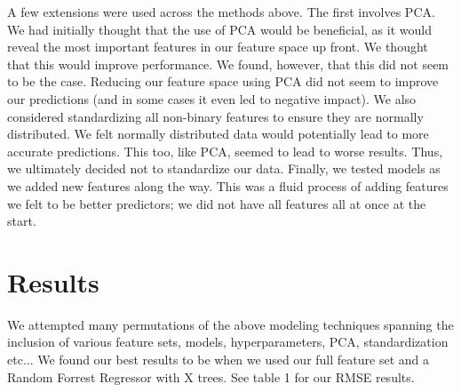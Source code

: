 \documentclass[11pt, oneside]{article}   	%
\begin{document}
A few extensions were used across the methods above. The first involves PCA. We had initially thought that the use of PCA would be beneficial, as it would reveal the most important features in our feature space up front. We thought that this would improve performance. We found, however, that this did not seem to be the case. Reducing our feature space using PCA did not seem to improve our predictions (and in some cases it even led to negative impact). We also considered standardizing all non-binary features to ensure they are normally distributed. We felt normally distributed data would potentially lead to more accurate predictions. This too, like PCA, seemed to lead to worse results. Thus, we ultimately decided not to standardize our data. Finally, we tested models as we added new features along the way. This was a fluid process of adding features we felt to be better predictors; we did not have all features all at once at the start.

\section{Results}
We attempted many permutations of the above modeling techniques spanning the inclusion of various feature sets, models, hyperparameters, PCA, standardization etc... We found our best results to be when we used our full feature set and a Random Forrest Regressor with X trees. See table 1 for our RMSE results. 
\end{document}
